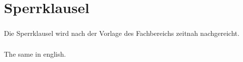 \chapter{Sperrklausel}
\paragraph*{}
Die Sperrklausel wird nach der Vorlage des Fachbereichs zeitnah nachgereicht.

\paragraph*{}
The same in english.